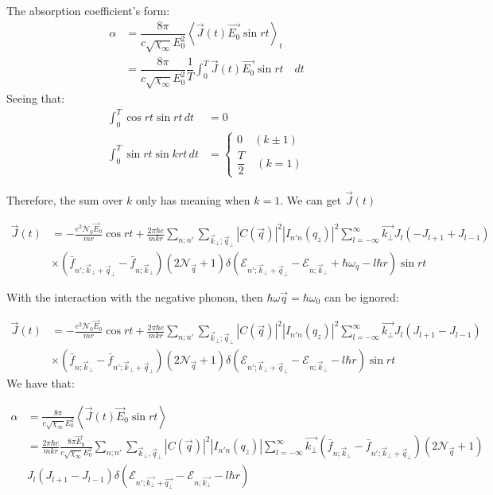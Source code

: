 \documentclass{article}
\begin{document}
The absorption coefficient's form:  
\begin{align*}
    \alpha &= \dfrac{8\pi}{c\sqrt{\chi_\infty}E_{0}^2}\left\langle\vec{J}(t) \vec{E_0}\sin{rt} \right\rangle_{t}\\
    & = \dfrac{8\pi}{c\sqrt{\chi_\infty}E_{0}^2}\dfrac{1}{T}\int_{0}^{T}\vec{J}(t)\vec{E_0}\sin{rt} \quad dt
\end{align*}
Seeing that:
\begin{align*}
    \int_{0}^{T}\cos{rt} \sin{rt} \, dt &= 0\\
    \int_{0}^T \sin{rt} \sin{k r t} \, dt &= \begin{cases}
        0 \quad (k \pm 1) \\
        \dfrac{T}{2} \quad (k = 1)
    \end{cases}
\end{align*}

Therefore, the sum over $k$ only has meaning when $k=1$. We can get $\vec{J}(t)$

\begin{align*}
    \vec{J}(t) &= -\frac{e^2 \mathcal{N}_0 \vec{E}_0}{m r} \cos rt + \frac{2\pi \hbar e}{m k r} \sum_{n;n'} \sum_{\vec{k}_\bot; \vec{q}_\bot} |C(\vec{q})|^2 |I_{n'n}(q_z)|^2 \sum_{l=-\infty}^{\infty} \vec{k_\bot} J_l (-J_{l+1} + J_{l-1}) \\
&\times (\bar{f}_{n'; \vec{k}_\bot+\vec{q}_\bot} - \bar{f}_{n; \vec{k}_\bot}) (2\mathcal{N}_{\vec{q}} + 1) \delta(\mathcal{E}_{n'; \vec{k}_\bot+\vec{q}_\bot} - \mathcal{E}_{n; \vec{k}_\bot} + \hbar \omega_q - l \hbar r) \sin rt
\end{align*}

With the interaction with the negative phonon, then $\hbar\omega\vec{q}=\hbar\omega_0$ can be ignored:

\begin{align*}
    \vec{J}(t) &= -\frac{e^2 \mathcal{N}_0 \vec{E}_0}{m r} \cos rt + \frac{2\pi \hbar e}{m k r} \sum_{n;n'} \sum_{\vec{k}_\bot; \vec{q}_\bot} |C(\vec{q})|^2 |I_{n'n}(q_z)|^2 \sum_{l=-\infty}^{\infty} \vec{k_\bot} J_l (J_{l+1} - J_{l-1}) \\
&\times ( \bar{f}_{n; \vec{k}_\bot}-\bar{f}_{n'; \vec{k}_\bot+\vec{q}_\bot}) (2\mathcal{N}_{\vec{q}} + 1) \delta(\mathcal{E}_{n'; \vec{k}_\bot+\vec{q}_\bot} - \mathcal{E}_{n; \vec{k}_\bot} - l \hbar r) \sin rt
\end{align*}
We have that:

\begin{align*}
    \alpha &= \frac{8\pi}{c \sqrt{\chi_\infty} E_0^2} \left\langle \vec{J}(t) \vec{E}_0 \sin rt \right\rangle \\
&= \frac{2\pi \hbar e}{m k r} \frac{8\pi \vec{E}_0}{c \sqrt{\chi_\infty} E_0^2} \sum_{n;n'} \sum_{\vec{k}_\bot, \vec{q}_\bot} |C(\vec{q})|^2 |I_{n'n}(q_z)| \sum_{l=-\infty}^{\infty} \vec{k_\bot}(\bar{f}_{n; \vec{k}_\bot} - \bar{f}_{n'; \vec{k}_\bot+\vec{q}_\bot}) (2\mathcal{N}_{\vec{q}} + 1)\\
& J_l(J_{l+1} - J_{l-1}) \delta (\mathcal{E}_{n';\vec{k_\bot}+\vec{q_\bot}}-\mathcal{E}_{n;\vec{k_\bot}}-l\hbar r)
\end{align*}
\end{document}
